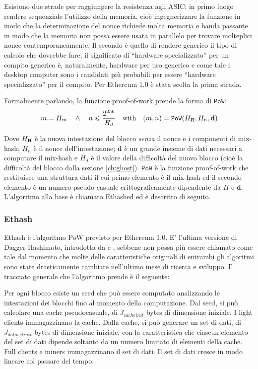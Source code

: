 \documentclass[9pt,oneside]{amsart}
\newcommand{\hcancel}[1]{%
    \tikz[baseline=(tocancel.base)]{
        \node[inner sep=0pt,outer sep=0pt] (tocancel) {#1};
        \draw[black] (tocancel.south west) -- (tocancel.north east);
    }%
}%
\begin{document}
\begin{multicols}{2}
Esistono due strade per raggiungere la resistenza agli ASIC; in primo luogo rendere sequenziale l'utilizzo della memoria, cioè ingegnerizzare la funzione in modo che la determinazione del nonce richiede molta memoria e banda passante in modo che la memoria non possa essere usata in parallelo per trovare molteplici nonce contemporaneamente. Il secondo è quello di rendere generico il tipo di calcolo che dovrebbe fare; il significato di ``hardware specializzato'' per un compito generico è, naturalmente, hardware per uso generico e come tale i desktop computer sono i candidati più probabili per essere ``hardware specializzato'' per il compito. Per Ethereum 1.0 è stata scelta la prima strada.

Formalmente parlando, la funzione proof-of-work prende la forma di $\mathtt{PoW}$:
\begin{equation}
m = H_m \quad \wedge \quad n \leqslant \frac{2^{256}}{H_d} \quad \text{with} \quad (m, n) = \mathtt{PoW}(H_{\hcancel{n}}, H_n, \mathbf{d})
\end{equation}

Dove $H_{\hcancel{n}}$ è la nuova intestazione del blocco \textit{senza} il nonce e i componenti di mix-hash; $H_n$ è il nonce dell'intestazione; $\mathbf{d}$ è un grande insieme di dati necessari a computare il mix-hash e $H_d$ è il valore della difficoltà del nuovo blocco (cioè la difficoltà del blocco dalla sezione \ref{ch:ghost}). $\mathtt{PoW}$ è la funzione proof-of-work che restituisce  una struttura dati il cui primo elemento è il mix-hash ed il secondo elemento è un numero pseudo-casuale crittograficamente dipendente da $H$ e $\mathbf{d}$. L'algoritmo alla base è chiamato Ethashed ed è descritto di seguito.
\subsubsection{Ethash}
Ethash è l'algoritmo PoW previsto per Ethereum 1.0. E' l'ultima versione di Dagger-Hashimoto, introdotta da \cite{dagger} e \cite{hashimoto}, sebbene non possa più essere chiamato come tale dal momento che molte delle caratteristiche originali di entrambi gli algoritmi sono state drasticamente cambiate nell'ultimo mese di ricerca e sviluppo. Il tracciato generale che l'algoritmo prende è il seguente:

Per ogni blocco esiste un seed che può essere computato analizzando le intestazioni dei blocchi fino al momento della computazione. Dal seed, si può calcolare una cache pseudocasuale, di $J_{cacheinit}$ bytes di dimensione iniziale. I light clients immagazzinano la cache. Dalla cache, si può generare un set di dati, di $J_{datasetinit}$ bytes di dimensione iniziale, con la caratteristica che ciascun elemento del set di dati dipende soltanto da un numero limitato di elementi della cache. Full clients e miners immagazzinano il set di dati. Il set di dati cresce in modo lineare col passare del tempo.


\end{multicols}
\end{document}
